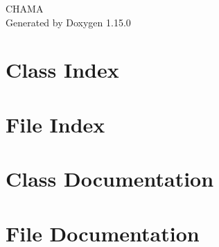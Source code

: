 \documentclass[twoside]{book}
\newcommand{\+}{\discretionary{\mbox{\scriptsize$\hookleftarrow$}}{}{}}
\newcommand{\clearemptydoublepage}{%
    \newpage{\pagestyle{empty}\cleardoublepage}%
  }
\begin{document}
  \raggedbottom
    \hypersetup{pageanchor=false,
                bookmarksnumbered=true,
                pdfencoding=unicode
               }
  \begin{titlepage}
  \vspace*{7cm}
  \begin{center}%
  {\Large CHAMA}\\
  \vspace*{1cm}
  {\large Generated by Doxygen 1.15.0}\\
  \end{center}
  \end{titlepage}
  \clearemptydoublepage
  \tableofcontents
  \clearemptydoublepage
  \hypersetup{pageanchor=true}

\chapter{Class Index}

\chapter{File Index}

\chapter{Class Documentation}

\chapter{File Documentation}







  \backmatter
  \newpage
  \clearemptydoublepage
  \printindex
\end{document}
